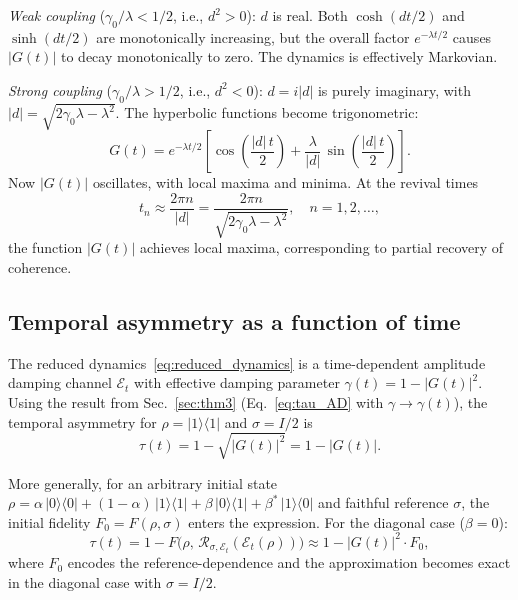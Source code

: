 \documentclass[prl,twocolumn,superscriptaddress,longbibliography]{revtex4-2}
\newcommand{\Petz}{\mathcal{R}}
\newcommand{\ket}[1]{|#1\rangle}
\newcommand{\bra}[1]{\langle#1|}
\newcommand{\tauasym}{\tau}
\begin{document}
\emph{Weak coupling} ($\gamma_0/\lambda < 1/2$, i.e., $d^2 > 0$):
$d$ is real.  Both $\cosh(dt/2)$ and $\sinh(dt/2)$ are monotonically
increasing, but the overall factor $e^{-\lambda t/2}$ causes
$|G(t)|$ to decay monotonically to zero.  The dynamics is
effectively Markovian.

\emph{Strong coupling} ($\gamma_0/\lambda > 1/2$, i.e., $d^2 < 0$):
$d = i|d|$ is purely imaginary, with
$|d| = \sqrt{2\gamma_0\lambda - \lambda^2}$.
The hyperbolic functions become trigonometric:
\begin{equation}
G(t) = e^{-\lambda t/2}\!\left[
\cos\!\left(\frac{|d|\,t}{2}\right)
+ \frac{\lambda}{|d|}\,\sin\!\left(\frac{|d|\,t}{2}\right)
\right].
\label{eq:G_strong}
\end{equation}
Now $|G(t)|$ oscillates, with local maxima and minima.  At the
revival times
\begin{equation}
t_n \approx \frac{2\pi n}{|d|}
= \frac{2\pi n}{\sqrt{2\gamma_0\lambda - \lambda^2}},
\quad n = 1, 2, \ldots,
\label{eq:revival_time}
\end{equation}
the function $|G(t)|$ achieves local maxima, corresponding to
partial recovery of coherence.

\subsection{Temporal asymmetry as a function of time}

The reduced dynamics~\eqref{eq:reduced_dynamics} is a time-dependent
amplitude damping channel $\mathcal{E}_t$ with effective damping
parameter $\gamma(t) = 1 - |G(t)|^2$.  Using the result from
Sec.~\ref{sec:thm3} (Eq.~\eqref{eq:tau_AD} with $\gamma \to \gamma(t)$),
the temporal asymmetry for $\rho = \ket{1}\!\bra{1}$ and
$\sigma = I/2$ is
\begin{equation}
\tauasym(t) = 1 - \sqrt{|G(t)|^2} = 1 - |G(t)|.
\label{eq:tau_t}
\end{equation}

More generally, for an arbitrary initial state
$\rho = \alpha\,\ket{0}\!\bra{0} + (1-\alpha)\,\ket{1}\!\bra{1}
+ \beta\,\ket{0}\!\bra{1} + \beta^*\,\ket{1}\!\bra{0}$
and faithful reference $\sigma$, the initial fidelity
$F_0 = F(\rho, \sigma)$ enters the expression.  For the
diagonal case ($\beta = 0$):
\begin{equation}
\tauasym(t) = 1 - F\!\big(\rho,\,
\Petz_{\sigma,\mathcal{E}_t}(\mathcal{E}_t(\rho))\big)
\approx 1 - |G(t)|^2 \cdot F_0,
\label{eq:tau_general}
\end{equation}
where $F_0$ encodes the reference-dependence and the approximation
becomes exact in the diagonal case with $\sigma = I/2$.
\end{document}
